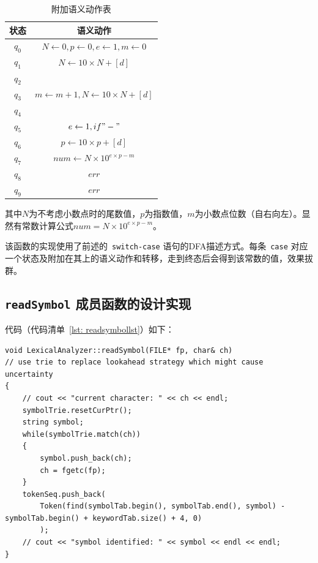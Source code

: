 \documentclass{article}
\begin{document}
\begin{CJK*}{UTF8}{gbsn}
\begin{table}[h!]
\centering
\begin{tabular}{c|c}
\hline
状态&	语义动作																\\ \hline
$q_0$&		$N \leftarrow 0, p \leftarrow 0, e \leftarrow 1, m \leftarrow 0$ \\
$q_1$&		$N \leftarrow 10 \times N + [d]$ 								\\
$q_2$&		 																\\
$q_3$&		$m \leftarrow m + 1, N \leftarrow 10 \times N + [d]$ 			\\
$q_4$&		 																\\
$q_5$&		$e \leftarrow 1, if "-"$ 										\\
$q_6$&		$p \leftarrow 10 \times p + [d]$ 								\\
$q_7$&		$num \leftarrow N \times 10^{e \times p - m}$ 					\\
$q_8$&		$err$ 															\\
$q_9$&		$err$ 															\\
\hline
\end{tabular}
\caption{附加语义动作表}
\label{tab: semacttab}
\end{table}

其中$N$为不考虑小数点时的尾数值，$p$为指数值，$m$为小数点位数（自右向左）。显然有常数计算公式$num = N \times 10^{e \times p - m}$。

该函数的实现使用了前述的~\texttt{switch-case} 语句的DFA描述方式。每条~\texttt{case} 对应一个状态及附加在其上的语义动作和转移，走到终态后会得到该常数的值，效果拔群。

\subsection{\texttt{readSymbol} 成员函数的设计实现}
代码（代码清单~\ref{lst: readsymbollst}）如下：
\begin{center}
\begin{lstlisting}[caption = {\texttt{readSymbol} 成员函数代码清单}, label = {lst: readsymbollst}]
void LexicalAnalyzer::readSymbol(FILE* fp, char& ch)
// use trie to replace lookahead strategy which might cause uncertainty
{
	// cout << "current character: " << ch << endl;
	symbolTrie.resetCurPtr();
	string symbol;
	while(symbolTrie.match(ch))
	{
		symbol.push_back(ch);
		ch = fgetc(fp);
	}
	tokenSeq.push_back(
		Token(find(symbolTab.begin(), symbolTab.end(), symbol) - symbolTab.begin() + keywordTab.size() + 4, 0)
		);
	// cout << "symbol identified: " << symbol << endl << endl;
}
\end{lstlisting}
\end{center}


\end{CJK*}
\end{document}
